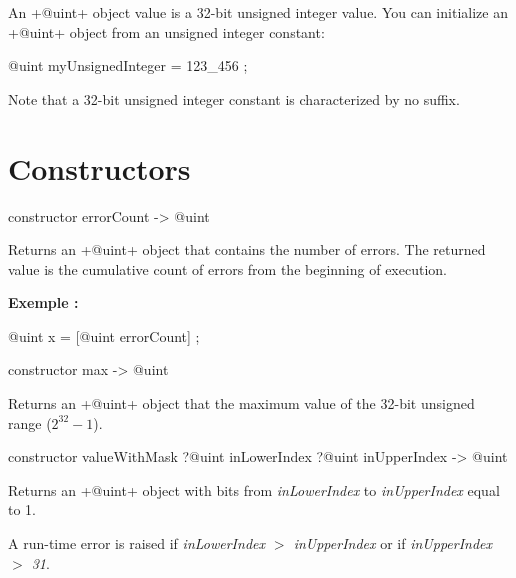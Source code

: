 

An \ggs+@uint+ object value is a 32-bit unsigned integer value. You can initialize an \ggs+@uint+ object from an unsigned integer constant:\\

\begin{galgascode}
@uint myUnsignedInteger = 123_456 ;
\end{galgascode}

Note that a 32-bit unsigned integer constant is characterized by no suffix.

\section{Constructors}


\begin{galgascode}
constructor errorCount -> @uint
\end{galgascode}


Returns an \ggs+@uint+ object that contains the number of errors. The returned value is the cumulative count of errors from the beginning of execution.

\textbf{Exemple :}
\begin{galgascode}
@uint x = [@uint errorCount] ;
\end{galgascode}





\begin{galgascode}
constructor max -> @uint
\end{galgascode}

Returns an \ggs+@uint+ object that the maximum value of the 32-bit unsigned range ($2^{32}-1$).



\begin{galgascode}
constructor valueWithMask ?@uint inLowerIndex ?@uint inUpperIndex -> @uint
\end{galgascode}


Returns an \ggs+@uint+ object with bits from \emph{inLowerIndex} to \emph{inUpperIndex} equal to 1.

A run-time error is raised if \emph{inLowerIndex $>$ inUpperIndex} or if \emph{inUpperIndex $>$ 31}.



